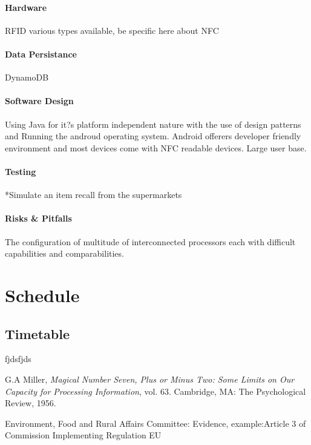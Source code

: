 \documentclass[a4paper, 11pt]{article}
\begin{document}
\paragraph{Hardware}
RFID various types available, be specific here about NFC

\paragraph{Data Persistance}
DynamoDB

\paragraph{Software Design}
Using Java for it?s platform independent nature with the use of design patterns and 
Running the androud operating system. Android offerers developer friendly environment and most devices come with NFC readable devices. Large user base.

\paragraph{Testing}
*Simulate an item recall from the supermarkets

\paragraph{Risks \& Pitfalls}
The configuration of multitude of interconnected processors each with difficult capabilities and comparabilities.

\clearpage

\section{Schedule}
\subsection{Timetable}

\clearpage

\begin{thebibliography}{11}

	fjdsfjds
	
	G.A Miller, \emph{Magical Number Seven, Plus or Minus Two: Some Limits on Our Capacity for Processing Information}, vol. 63. Cambridge, MA: The Psychological Review, 1956.

Environment, Food and Rural Affairs Committee: Evidence,
example:Article 3 of Commission Implementing Regulation EU


\end{thebibliography}
\end{document}
